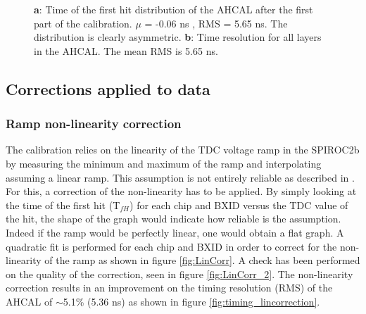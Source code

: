 \documentclass[twoside,a4paper,11pt]{article}
\begin{document}
\begin{figure}[htbp]
	\hfill
	\hfill
\caption[]{\textbf{a}: Time of the first hit distribution of the AHCAL after the first part of the calibration. $\mu$ = -0.06 ns , RMS = 5.65 ns. The distribution is clearly asymmetric. \textbf{b}: Time resolution for all layers in the AHCAL. The mean RMS is 5.65 ns.}
\end{figure}

\subsection{Corrections applied to data}
\subsubsection{Ramp non-linearity correction}
\label{subsec:lin_corr}

The calibration relies on the linearity of the TDC voltage ramp in the SPIROC2b by measuring the minimum and maximum of the ramp and interpolating assuming a linear ramp. This assumption is not entirely reliable as described in \cite{OskarSSP, EldwanSSP}. For this, a correction of the non-linearity has to be applied. By simply looking at the time of the first hit (T$_{fH}$) for each chip and BXID versus the TDC value of the hit, the shape of the graph would indicate how reliable is the assumption. Indeed if the ramp would be perfectly linear, one would obtain a flat graph. A quadratic fit is performed for each chip and BXID in order to correct for the non-linearity of the ramp as shown in figure \ref{fig:LinCorr}. A check has been performed on the quality of the correction, seen in figure \ref{fig:LinCorr_2}. The non-linearity correction results in an improvement on the timing resolution (RMS) of the AHCAL of $\sim$5.1\% (5.36 ns) as shown in figure \ref{fig:timing_lincorrection}.
\end{document}
